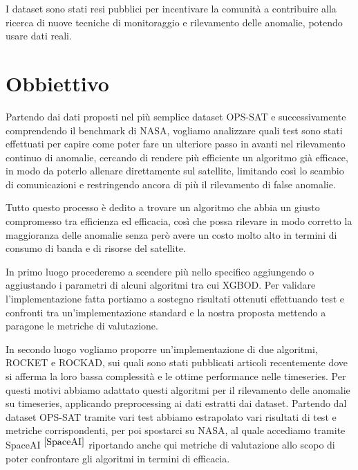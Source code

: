 I dataset sono stati resi pubblici per incentivare la comunità a contribuire alla ricerca di nuove tecniche di monitoraggio e rilevamento delle anomalie, potendo usare dati reali.

\section{Obbiettivo}
Partendo dai dati proposti nel più semplice dataset OPS-SAT e successivamente comprendendo il benchmark di NASA, vogliamo analizzare quali test sono stati effettuati per capire come poter fare un ulteriore passo in avanti nel rilevamento continuo di anomalie, cercando di rendere più efficiente un algoritmo già efficace, in modo da poterlo allenare direttamente sul satellite, limitando così lo scambio di comunicazioni e restringendo ancora di più il rilevamento di false anomalie.

Tutto questo processo è dedito a trovare un algoritmo che abbia un giusto compromesso tra efficienza ed efficacia, così che possa rilevare in modo corretto la maggioranza delle anomalie senza però avere un costo molto alto in termini di consumo di banda e di risorse del satellite.

In primo luogo procederemo a scendere più nello specifico aggiungendo o aggiustando i parametri di alcuni algoritmi tra cui XGBOD.
Per validare l'implementazione fatta portiamo a sostegno risultati ottenuti effettuando test e confronti tra un'implementazione standard e la nostra proposta mettendo a paragone le metriche di valutazione.

In secondo luogo vogliamo proporre un'implementazione di due algoritmi, ROCKET e ROCKAD, sui quali sono stati pubblicati articoli recentemente dove si afferma la loro bassa complessità e le ottime performance nelle timeseries.
Per questi motivi abbiamo adattato questi algoritmi per il rilevamento delle anomalie su timeseries, applicando preprocessing ai dati estratti dai dataset. Partendo dal dataset OPS-SAT tramite vari test abbiamo estrapolato vari risultati di test e metriche corrispondenti, per poi spostarci su NASA, al quale accediamo tramite SpaceAI $^{\cite{SpaceAI}}$ riportando anche qui metriche di valutazione allo scopo di poter confrontare gli algoritmi in termini di efficacia.

